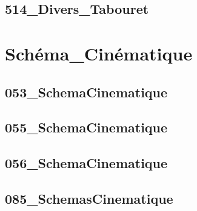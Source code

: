 \subsection{514\_Divers\_Tabouret}
\graphicspath{{../02-Modélisation des mécanismes/TD/Paramétrage/514_Divers_Tabouret/images/}{../02-Modélisation des mécanismes/TD/Paramétrage/514_Divers_Tabouret/}{../Style/png/}}


\section{Schéma\_Cinématique}

\subsection{053\_SchemaCinematique}
\graphicspath{{../02-Modélisation des mécanismes/TD/Schéma_Cinématique/053_SchemaCinematique/images/}{../02-Modélisation des mécanismes/TD/Schéma_Cinématique/053_SchemaCinematique/}{../Style/png/}}


\subsection{055\_SchemaCinematique}
\graphicspath{{../02-Modélisation des mécanismes/TD/Schéma_Cinématique/055_SchemaCinematique/images/}{../02-Modélisation des mécanismes/TD/Schéma_Cinématique/055_SchemaCinematique/}{../Style/png/}}


\subsection{056\_SchemaCinematique}
\graphicspath{{../02-Modélisation des mécanismes/TD/Schéma_Cinématique/056_SchemaCinematique/images/}{../02-Modélisation des mécanismes/TD/Schéma_Cinématique/056_SchemaCinematique/}{../Style/png/}}


\subsection{085\_SchemasCinematique}
\graphicspath{{../02-Modélisation des mécanismes/TD/Schéma_Cinématique/085_SchemasCinematique/images/}{../02-Modélisation des mécanismes/TD/Schéma_Cinématique/085_SchemasCinematique/}{../Style/png/}}


